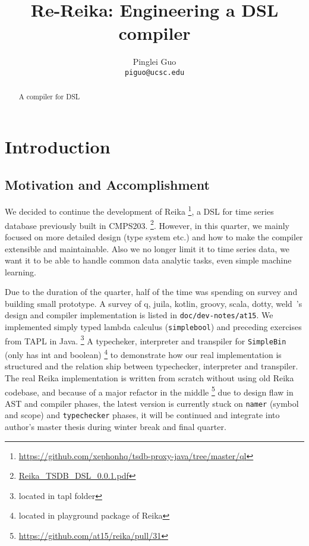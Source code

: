 \documentclass{article}
\title{Re-Reika: Engineering a DSL compiler}
\author{
Pinglei Guo \\
\texttt{piguo@ucsc.edu}
}
\begin{document}
\maketitle

\begin{abstract}
    A compiler for DSL
\end{abstract}

\section{Introduction}
\label{sec:introduction}

\subsection{Motivation and Accomplishment}
\label{subsec:motivation}

We decided to continue the development of Reika \footnote{\url{https://github.com/xephonhq/tsdb-proxy-java/tree/master/ql}},
a DSL for time series database previously built in CMPS203.
\footnote{\href{https://github.com/xephonhq/tsdb-proxy-java/blob/master/ql/Reika\_TSDB\_DSL\_0.0.1.pdf}{Reika\_TSDB\_DSL\_0.0.1.pdf}}.
However, in this quarter, we mainly focused on more detailed design (type system etc.)
and how to make the compiler extensible and maintainable.
Also we no longer limit it to time series data, we want it to be able to handle common data analytic tasks, even simple machine learning.

Due to the duration of the quarter, half of the time was spending on survey and building small prototype.
A survey of q, juila, kotlin, groovy, scala, dotty, weld~\cite{palkar2017weld}'s design and compiler implementation is listed in \verb+doc/dev-notes/at15+.
We implemented simply typed lambda calculus (\verb+simplebool+) and preceding exercises from TAPL in Java.
\footnote{located in tapl folder}
A typecheker, interpreter and transpiler for \verb+SimpleBin+ (only has int and boolean) \footnote{located in playground package of Reika}
to demonstrate how our real implementation is structured and the relation ship between typechecker, interpreter and transpiler.
The real Reika implementation is written from scratch without using old Reika codebase,
and because of a major refactor in the middle \footnote{\url{https://github.com/at15/reika/pull/31}} due to design flaw in AST and compiler phases, the latest version is currently stuck on
\verb+namer+ (symbol and scope) and \verb+typechecker+ phases,
it will be continued and integrate into author's master thesis during winter break and final quarter.
\end{document}
